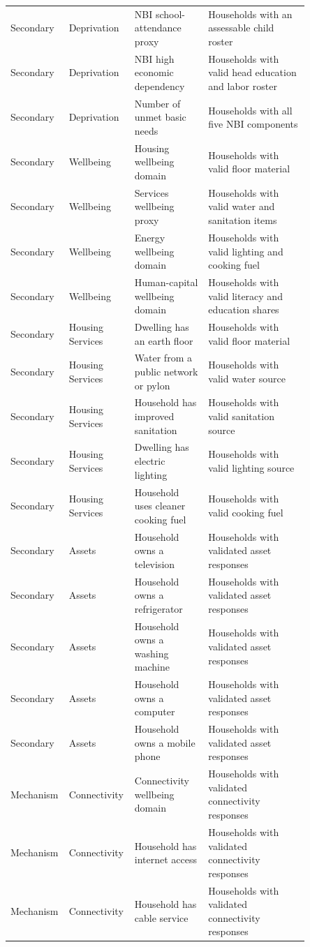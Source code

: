 \begin{longtable}{p{0.10\linewidth}p{0.18\linewidth}p{0.24\linewidth}p{0.33\linewidth}}
Secondary & Deprivation & NBI school-attendance proxy & Households with an assessable child roster \\
Secondary & Deprivation & NBI high economic dependency & Households with valid head education and labor roster \\
Secondary & Deprivation & Number of unmet basic needs & Households with all five NBI components \\
Secondary & Wellbeing & Housing wellbeing domain & Households with valid floor material \\
Secondary & Wellbeing & Services wellbeing proxy & Households with valid water and sanitation items \\
Secondary & Wellbeing & Energy wellbeing domain & Households with valid lighting and cooking fuel \\
Secondary & Wellbeing & Human-capital wellbeing domain & Households with valid literacy and education shares \\
Secondary & Housing Services & Dwelling has an earth floor & Households with valid floor material \\
Secondary & Housing Services & Water from a public network or pylon & Households with valid water source \\
Secondary & Housing Services & Household has improved sanitation & Households with valid sanitation source \\
Secondary & Housing Services & Dwelling has electric lighting & Households with valid lighting source \\
Secondary & Housing Services & Household uses cleaner cooking fuel & Households with valid cooking fuel \\
Secondary & Assets & Household owns a television & Households with validated asset responses \\
Secondary & Assets & Household owns a refrigerator & Households with validated asset responses \\
Secondary & Assets & Household owns a washing machine & Households with validated asset responses \\
Secondary & Assets & Household owns a computer & Households with validated asset responses \\
Secondary & Assets & Household owns a mobile phone & Households with validated asset responses \\
Mechanism & Connectivity & Connectivity wellbeing domain & Households with validated connectivity responses \\
Mechanism & Connectivity & Household has internet access & Households with validated connectivity responses \\
Mechanism & Connectivity & Household has cable service & Households with validated connectivity responses \\
\bottomrule
\end{longtable}
